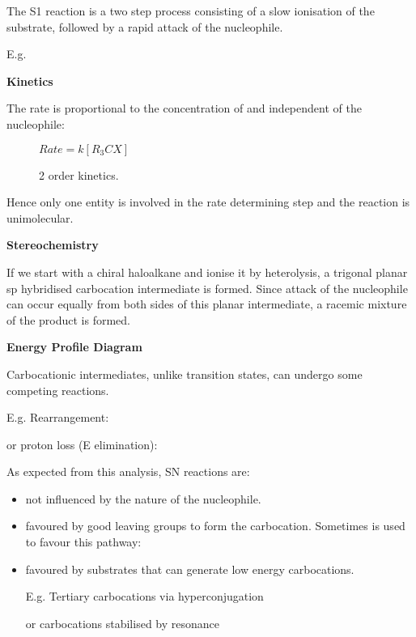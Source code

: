 The S1 reaction is a two step process consisting of a slow ionisation
of the substrate, followed by a rapid attack of the nucleophile.


E.g.


\textbf{Kinetics}

The rate is proportional to the concentration of  and independent of
the nucleophile:

\begin{figure}[H]
  \centering
  $Rate = k[R_3CX]$
  \caption*{2 order kinetics.}
\end{figure}

Hence only one entity is involved in the rate determining step and the reaction
is unimolecular.

\textbf{Stereochemistry}

If we start with a chiral haloalkane and ionise it by heterolysis, a trigonal
planar sp hybridised carbocation intermediate is formed. Since attack of
the nucleophile can occur equally from both sides of this planar intermediate, a
racemic mixture of the product is formed.


\textbf{Energy Profile Diagram}


Carbocationic intermediates, unlike transition states, can undergo some competing
reactions.

E.g. Rearrangement:


or proton loss (E elimination):


As expected from this analysis, SN reactions are:

\begin{itemize}
  \item not influenced by the nature of the nucleophile.
  \item favoured by good leaving groups to form the carbocation. Sometimes  is used to favour this pathway: 
  \item favoured by substrates that can generate low energy carbocations.

    E.g. Tertiary carbocations via hyperconjugation


    or carbocations stabilised by resonance


\end{itemize}